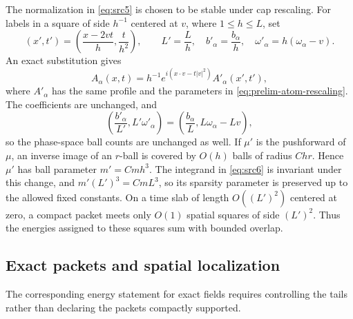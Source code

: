 The normalization in \eqref{eq:src5} is chosen to be stable under cap
rescaling.  For labels in a square of side $h^{-1}$ centered at $v$, where
$1\leq h\leq L$, set
\begin{equation}
 (x',t')=\left(\frac{x-2vt}{h},\frac{t}{h^2}\right),\qquad
 L'=\frac Lh,\quad b'_\alpha=\frac{b_\alpha}{h},\quad
 \omega'_\alpha=h(\omega_\alpha-v).
 \label{eq:prelim-atom-rescaling}
\end{equation}
An exact substitution gives
\begin{equation}
 A_\alpha(x,t)=h^{-1}e^{i(x\cdot v-t|v|^2)}A'_\alpha(x',t'),
 \label{eq:prelim-atom-covariance}
\end{equation}
where $A'_\alpha$ has the same profile and the parameters in
\eqref{eq:prelim-atom-rescaling}.  The coefficients are unchanged, and
\[
 \left(\frac{b'_\alpha}{L'},L'\omega'_\alpha\right)
 =\left(\frac{b_\alpha}{L},L\omega_\alpha-Lv\right),
\]
so the phase-space ball counts are unchanged as well.  If $\mu'$ is the
pushforward of $\mu$, an inverse image of an $r$-ball is covered by $O(h)$
balls of radius $Chr$.  Hence $\mu'$ has ball parameter $m'=Cmh^3$.
The integrand in \eqref{eq:src6} is invariant under this change, and
$m'(L')^3=CmL^3$, so its sparsity parameter is preserved up to the allowed
fixed constants.  On a time slab of length $O((L')^2)$ centered at zero, a
compact packet meets only $O(1)$ spatial squares of side $(L')^2$.  Thus the
energies assigned to these squares sum with bounded overlap.

\subsection{Exact packets and spatial localization}

The corresponding energy statement for exact fields requires controlling the
tails rather than declaring the packets compactly supported.

